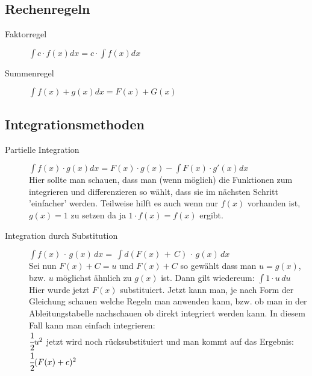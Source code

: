 \documentclass[a4paper]{scrartcl}
\begin{document}
        \subsection{Rechenregeln}
            \begin{description}
                \item[Faktorregel] $\int c  \cdot  f(x) dx = c  \cdot  \int f(x) dx$ 
                \item[Summenregel] $\int f(x) + g(x) dx = F(x) + G(x)$  
            \end{description}
        \newpage
        \subsection{Integrationsmethoden}
        \begin{description}
            \item[Partielle Integration] $\int f(x)  \cdot  g(x) dx = F(x)  \cdot  g(x) - \int F(x)  \cdot  g'(x) dx$ \\
             Hier sollte man schauen, dass man (wenn möglich) die Funktionen zum integrieren und differenzieren so wählt, dass sie im nächsten Schritt 'einfacher' werden.  
             Teilweise hilft es auch wenn nur $f(x)$ vorhanden ist, $g(x) = 1$ zu setzen da ja $1  \cdot  f(x) = f(x)$ ergibt.
             \item[Integration durch Substitution] $\int f(x)\,  \cdot  \,g(x)\, dx = \,\int d(F(x) \,+ \,C) \, \cdot  \,g(x) \,dx$ 
             \\Sei nun $F(x) + C = u$  und $F(x) + C$ so gewählt dass man $u = g(x)$, 
            bzw. $u$ möglichst ähnlich zu $g(x)$ ist. Dann gilt wiedereum: $\int 1  \cdot  u \,du $ 
            \\Hier wurde jetzt $F(x)$ substituiert. Jetzt kann man, je nach Form der Gleichung schauen welche Regeln man anwenden kann, bzw. ob man in der Ableitungstabelle nachschauen ob direkt integriert werden kann.
            In diesem Fall kann man einfach integrieren: \\$\cfrac{1}{2}u^2$ jetzt wird noch rücksubstituiert und man kommt auf das Ergebnis: $\cfrac{1}{2}(F(x) + c)^2$
        \end{description}
\end{document}
